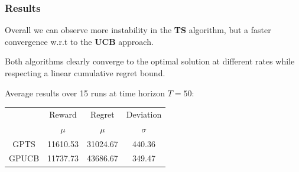 \begin{frame}

\frametitle{Results}

Overall we can observe more instability in the \textbf{TS} algorithm, but a faster convergence w.r.t to the \textbf{UCB} approach.

Both algorithms clearly converge to the optimal solution at different rates while respecting a linear cumulative regret bound.

Average results over 15 runs at time horizon $T = 50$:

\begin{table}
	\begin{tabular}{|c|cc|c|}
	\hline \hline
		\cellcolor{blue!25} & Reward 	& Regret	& Deviation \\
	\cline{2-4}
		\cellcolor{blue!25} & $\mu$		& $\mu$		& $\sigma$	\\
	\hline \hline
		GPTS 				& 11610.53 	& 31024.67	& 440.36 	\\
	\hline
		GPUCB				& 11737.73	& 43686.67	& 349.47	\\
	\hline \hline
	\end{tabular}
\end{table}

\end{frame}

